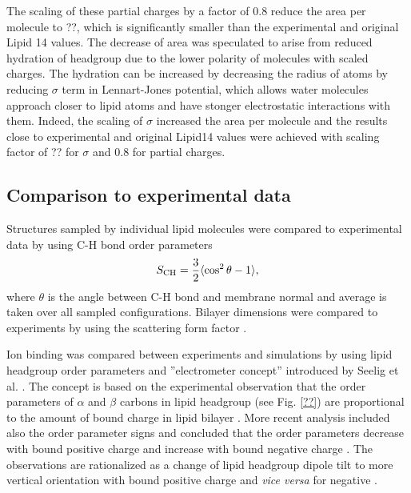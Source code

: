 \documentclass[aip,jcp,twocolumn]{revtex4}
\begin{document}
The scaling of these partial charges by a factor of 0.8 reduce the 
area per molecule to ??, which is significantly smaller than the
experimental and original Lipid 14 values.  
The decrease of area was speculated 
to arise from reduced hydration
of headgroup due to the lower polarity of molecules with scaled charges.
The hydration can be increased by decreasing the radius of atoms
by reducing $\sigma$ term in Lennart-Jones potential, which
allows water molecules approach closer to lipid atoms and
have stonger electrostatic interactions with them.
Indeed, the scaling of $\sigma$ increased the area per molecule
and the results close to experimental and original Lipid14 values were achieved
with scaling factor of ?? for $\sigma$ and 0.8 for partial charges.


\subsection{Comparison to experimental data}
Structures sampled by individual lipid molecules were compared
to experimental data by using C-H bond order parameters \cite{ollila16}
\begin{equation}
S_{\rm CH}=\frac{3}{2}\langle \cos^2\theta -1 \rangle,
\end{equation}
where $\theta$ is the angle between C-H bond and membrane
normal and average is taken over all sampled configurations.
Bilayer dimensions were compared to experiments by using the
scattering form factor \cite{ollila16}
. 

Ion binding was compared between experiments and simulations by 
using lipid headgroup order parameters and ''electrometer concept'' 
introduced by Seelig et al. \cite{seelig87,catte16}.
The concept is based on the experimental observation that the 
order parameters of $\alpha$ and $\beta$ carbons in lipid headgroup
(see Fig. \ref{??}) are proportional to the amount of bound charge
in lipid bilayer \cite{seelig87}. More recent analysis included also
the order parameter signs and concluded that the order parameters  
decrease with bound positive charge and increase with bound negative 
charge \cite{ollila16,catte16}. The observations are rationalized 
as a change of lipid headgroup dipole tilt to more vertical orientation
with bound positive charge and {\it vice versa} for negative \cite{seelig87}. 
\end{document}
